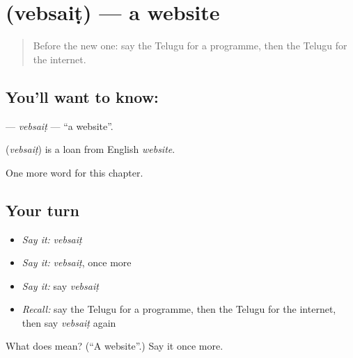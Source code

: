 \section[\texorpdfstring{\te{వెబ్సైట్} (vebsaiṭ)}{వెబ్సైట్ (vebsaiṭ)}]{ (vebsaiṭ) — a website}

\label{lesson:TE-C268-vebsait}



\begin{quote}
Before the new one: say the Telugu for a programme, then the Telugu for the internet.
\end{quote}

\subsection*{You'll want to know: }
\textbf{} — \emph{vebsaiṭ} — \textquotedblleft{}a website\textquotedblright{}.

\begin{cousinweb}
\textbf{} (\emph{vebsaiṭ}) is a loan from English \emph{website}.
\end{cousinweb}

\begin{grammarlens}[title={What you've built}]
One more word for this chapter.
\end{grammarlens}

\subsection*{Your turn}
\begin{itemize}
\raggedright
  \item \emph{Say it:} \emph{vebsaiṭ}
  \item \emph{Say it:} \emph{vebsaiṭ}, once more
  \item \emph{Say it:} say \emph{vebsaiṭ}
  \item \emph{Recall:} say the Telugu for a programme, then the Telugu for the internet, then say \emph{vebsaiṭ} again
\end{itemize}

\begin{tcolorbox}[breakable,colback=teal!4,colframe=teal!35!black,title={Before you move on}]
What does  mean? (\textquotedblleft{}A website\textquotedblright{}.) Say it once more.
\end{tcolorbox}
